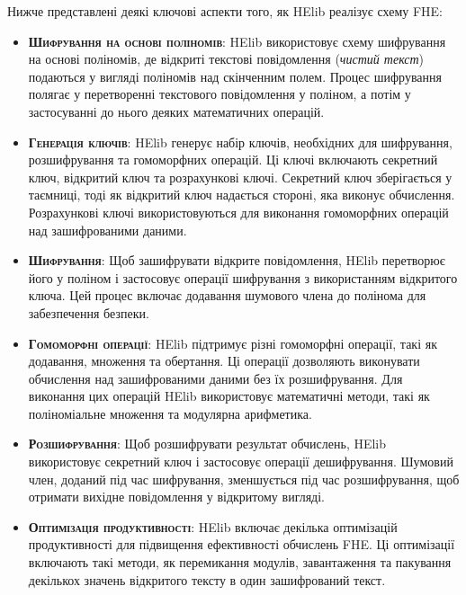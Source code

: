 Нижче представлені деякі ключові аспекти того, як HElib реалізує схему FHE:
\begin{itemize}
\item{\textsc{\textbf{Шифрування на основі поліномів}}: HElib використовує схему
    шифрування на основі поліномів, де відкриті текстові повідомлення 
    (\emph{чистий текст}) подаються у вигляді поліномів над скінченним полем. 
    Процес шифрування полягає у перетворенні текстового повідомлення у поліном, а потім у
    застосуванні до нього деяких математичних операцій.}

\item{\textsc{\textbf{Генерація ключів}}: HElib генерує набір ключів, необхідних для
    шифрування, розшифрування та гомоморфних операцій. Ці ключі включають секретний ключ,
    відкритий ключ та розрахункові ключі. Секретний ключ зберігається у таємниці, тоді як
    відкритий ключ надається стороні, яка виконує обчислення. Розрахункові ключі
    використовуються для виконання гомоморфних операцій над зашифрованими даними.} 

\item{\textsc{\textbf{Шифрування}}: Щоб зашифрувати відкрите повідомлення, HElib перетворює
    його у поліном і застосовує операції шифрування з використанням відкритого ключа. Цей
    процес включає додавання шумового члена до полінома для забезпечення безпеки.}

\item{\textsc{\textbf{Гомоморфні операції}}: HElib підтримує різні гомоморфні операції,
    такі як додавання, множення та обертання. Ці операції дозволяють виконувати обчислення
    над зашифрованими даними без їх розшифрування. Для виконання цих операцій HElib
    використовує математичні методи, такі як поліноміальне множення та модулярна арифметика.}

\item{\textsc{\textbf{Розшифрування}}: Щоб розшифрувати результат обчислень, HElib
    використовує секретний ключ і застосовує операції дешифрування. Шумовий член, доданий
    під час шифрування, зменшується під час розшифрування, щоб отримати вихідне
    повідомлення у відкритому вигляді.}

\item{\textsc{\textbf{Оптимізація продуктивності}}: HElib включає декілька оптимізацій
    продуктивності для підвищення ефективності обчислень FHE. Ці оптимізації включають такі
    методи, як перемикання модулів, завантаження та пакування декількох значень відкритого
    тексту в один зашифрований текст.}
\end{itemize}


